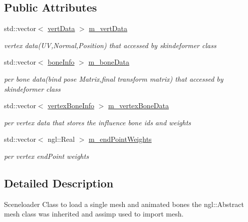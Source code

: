 \subsection*{Public Attributes}
\begin{DoxyCompactItemize}
\item 
std\-::vector$<$ \hyperlink{structvert_data}{vert\-Data} $>$ \hyperlink{class_scene_loader_a55597764e53f19f90331ee48fb8dab4c}{m\-\_\-vert\-Data}
\begin{DoxyCompactList}\small\item\em vertex data(\-U\-V,\-Normal,\-Position) that accessed by skindeformer class \end{DoxyCompactList}\item 
std\-::vector$<$ \hyperlink{structbone_info}{bone\-Info} $>$ \hyperlink{class_scene_loader_a05a42b9ae1841b41fb12e62873dc79c7}{m\-\_\-bone\-Data}
\begin{DoxyCompactList}\small\item\em per bone data(bind pose Matrix,final transform matrix) that accessed by skindeformer class \end{DoxyCompactList}\item 
std\-::vector$<$ \hyperlink{structvertex_bone_info}{vertex\-Bone\-Info} $>$ \hyperlink{class_scene_loader_a1835f991ea13ab5521868e603a62c8f0}{m\-\_\-vertex\-Bone\-Data}
\begin{DoxyCompactList}\small\item\em per vertex data that stores the influence bone ids and weights \end{DoxyCompactList}\item 
std\-::vector$<$ ngl\-::\-Real $>$ \hyperlink{class_scene_loader_a543a0d0ac431a63e02bf618ced255ee0}{m\-\_\-end\-Point\-Weights}
\begin{DoxyCompactList}\small\item\em per vertex end\-Point weights \end{DoxyCompactList}\end{DoxyCompactItemize}


\subsection{Detailed Description}
Sceneloader Class to load a single mesh and animated bones the ngl\-::\-Abstract mesh class was inherited and assimp used to import mesh. 

